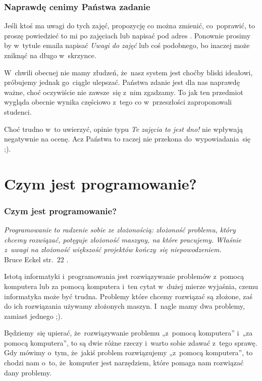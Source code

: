 \documentclass[10pt,t]{beamer}
\begin{document}
\begin{frame}
  \frametitle{Naprawdę cenimy Państwa zadanie}


  Jeśli ktoś ma uwagi do tych zajęć, propozycję co można zmienić,
  co~poprawić, to proszę powiedzieć to mi po zajęciach lub napisać pod
  adres \email. Ponownie prosimy by w~tytule emaila napisać
  \textit{Uwagi do zajęć} lub coś podobnego, bo inaczej może zniknąć na
  długo w~skrzynce.

  W~chwili obecnej nie mamy złudzeń, że~nasz system jest choćby bliski
  ideałowi, próbujemy jednak go~ciągle ulepszać. Państwa zdanie jest dla
  nas naprawdę \alert{ważne}, choć oczywiście nie zawsze~się z~nim zgadzamy.
  To jak ten przedmiot wygląda obecnie wynika częściowo z~tego co
  w~przeszłości zaproponowali studenci.

  Choć trudno w~to uwierzyć, opinie typu \textit{Te zajęcia to jest dno!}
  nie wpływają negatywnie na ocenę. Acz Państwa to raczej nie przekona
  do~wypowiadania~się ;).

\end{frame}










\section{Czym jest programowanie?}


\begin{frame}
  \frametitle{Czym jest programowanie?}


  \textit{Programowanie to radzenie sobie ze złożonością: złożoność
    problemu, który chcemy rozwiązać, potęguje złożoność maszyny, na które
    pracujemy. Właśnie z~uwagi na złożoność większość projektów kończy~się
    niepowodzeniem.} \\
  Bruce Eckel str.~$22$
  \parencite{Eckel-Thinnking-in-Java-Ed-polska-Wyd-III-Pub-2003}.

  Istotą informatyki i~programowania jest rozwiązywanie problemów z~pomocą
  komputera lub za pomocą komputera i~ten cytat w~dużej mierze wyjaśnia,
  czemu informatyka może być trudna. Problemy które chcemy rozwiązać są
  złożone, zaś do ich rozwiązania używamy złożonych maszyn. I~nagle mamy dwa
  problemy, zamiast jednego ;).

  Będziemy~się upierać, że~rozwiązywanie problemu „z~pomocą komputera”
  i~„za pomocą komputera”, to są dwie różne rzeczy i~warto sobie zdawać
  z~tego sprawę. Gdy mówimy o~tym, że~jakiś problem rozwiązujemy „z~pomocą
  komputera”, to chodzi nam o~to, że~komputer jest narzędziem, które
  pomaga nam rozwiązać dany problemy.

\end{frame}
\end{document}
